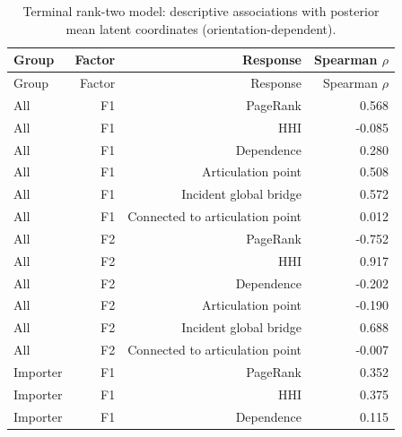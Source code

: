 \documentclass[pdftex,12pt,openright,a4paper,oneside]{book}
\begin{document}
\begin{longtable}{@{}p{}rrr@{}}

\caption{Terminal rank-two model: descriptive associations with posterior mean latent coordinates (orientation-dependent).}\label{tab:terminal_rank2_associations}\\

\toprule

Group & Factor & Response & Spearman $\rho$ \\

\midrule\endfirsthead

\toprule

Group & Factor & Response & Spearman $\rho$ \\

\midrule\endhead

All & F1 & PageRank & 0.568 \\

All & F1 & HHI & -0.085 \\

All & F1 & Dependence & 0.280 \\

All & F1 & Articulation point & 0.508 \\

All & F1 & Incident global bridge & 0.572 \\

All & F1 & Connected to articulation point & 0.012 \\

All & F2 & PageRank & -0.752 \\

All & F2 & HHI & 0.917 \\

All & F2 & Dependence & -0.202 \\

All & F2 & Articulation point & -0.190 \\

All & F2 & Incident global bridge & 0.688 \\

All & F2 & Connected to articulation point & -0.007 \\

Importer & F1 & PageRank & 0.352 \\

Importer & F1 & HHI & 0.375 \\

Importer & F1 & Dependence & 0.115 \\


\end{longtable}
\end{document}

